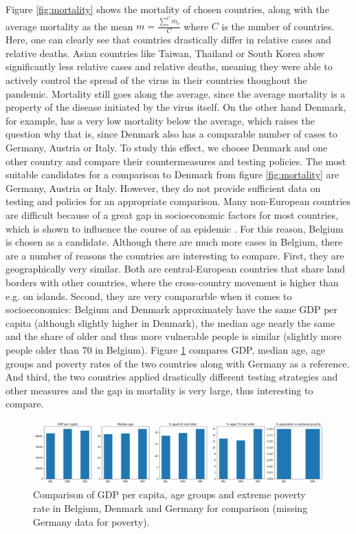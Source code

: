 \documentclass[a4paper,11pt]{article}
\begin{document}
Figure \ref{fig:mortality} shows the mortality of chosen countries, along with the average mortality as the mean $m = \frac{\sum_c^C m_c}{C}$ where $C$ is the number of countries. Here, one can clearly see
that countries drastically differ in relative cases and relative deaths. Asian countries like Taiwan, Thailand or South Korea show significantly less relative cases and relative deaths, meaning they were able to actively control the spread of the virus in their countries thoughout the pandemic. Mortality still goes along the average, since the average mortality is a property of the disease initiated by the virus itself. On the other hand Denmark, for example, has
a very low mortality below the average, which raises the question why that is, since Denmark also has a comparable number of cases to Germany, Austria or Italy.
To study this effect, we choose Denmark and one other country and compare their countermeasures
and testing policies. The most suitable candidates for a comparison to Denmark from figure \ref{fig:mortality} are Germany, Austria or Italy. However, they do not provide sufficient data on testing and policies for an appropriate comparison. Many non-European countries are difficult because of a great gap in socioeconomic factors for most countries, which is shown to influence
the course of an epidemic \cite{mena2021socioeconomic, bennett2021all}. For this reason, Belgium is chosen as a candidate. Although there
are much more cases in Belgium, there are a number of reasons the countries are interesting to compare. First, they are geographically very similar. Both are central-European countries that share land borders with other countries, where the cross-country movement is higher than e.g. on islands. Second, they are very compararble when it comes to socioeconomics: Belgium and Denmark approximately have the same GDP per capita (although slightly higher in Denmark), the median age nearly the same and the share of older and thus more vulnerable people is similar (slightly more people older than 70 in Belgium). Figure \ref{fig:socio_bel_den} compares GDP, median age, age groups and poverty rates of the two countries along with Germany as a reference. And third, the two countries applied drastically different testing strategies and other measures and the gap in mortality is very large, thus interesting to compare.

\begin{figure}[htb]
    \centering
    \includegraphics[width=\textwidth]{figures/Socioeconomic_bel_dnk.png}
    \caption{Comparison of GDP per capita, age groups and extreme poverty rate in Belgium, Denmark and Germany for comparison (missing Germany data for poverty).}
    \label{fig:socio_bel_den}
\end{figure}
\end{document}
